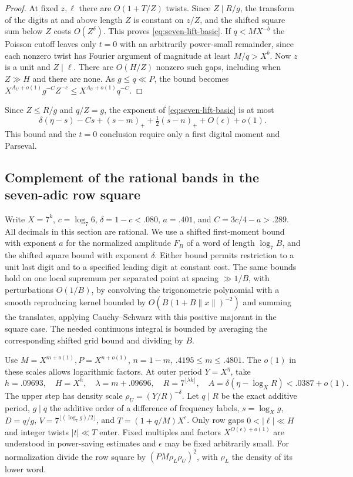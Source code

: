 \documentclass[11pt,a4paper]{article}
\theoremstyle{paperplain}
\numberwithin{equation}{section}
\begin{document}
\begin{proof}
At fixed $z,\ell$ there are $O(1+T/Z)$ twists.
Since $Z\mid R/g$, the transform of the digits at and above length
$Z$ is constant on $z/Z$, and the shifted square sum below $Z$ costs
$O(Z^\delta)$. This proves \eqref{eq:seven-lift-basic}. If
$q<MX^{-b}$ the Poisson cutoff leaves only $t=0$ with an arbitrarily
power-small remainder, since each nonzero twist has Fourier argument
of magnitude at least $M/q>X^b$. Now $z$ is a unit and $Z\mid\ell$.
There are $O(H/Z)$ nonzero such gaps, including when $Z\gg H$
and there are none. As $g\le q\ll P$, the bound becomes
$X^{A_U+o(1)}g^{-C}Z^{-c}\le X^{A_U+o(1)}q^{-C}$.
\end{proof}

Since $Z\le R/g$ and $q/Z=g$, the exponent of
\eqref{eq:seven-lift-basic} is at most
\[
   \delta(\eta-s)-Cs+(s-m)_++\tfrac12(s-n)_+
                 +O(\epsilon)+o(1).
\]
This bound and the $t=0$ conclusion require only a first digital
moment and Parseval.


\subsection{Complement of the rational bands in the seven-adic row square}
\label{sev:high}

Write $X=7^k$, $c=\log_7 6$, $\delta=1-c<.080$,
$a=.401$, and $C=3c/4-a>.289$. All decimals in this
section are rational. We use a shifted first-moment bound with
exponent $a$ for the normalized amplitude $F_B$ of a word
of length $\log_7 B$, and the shifted square bound with exponent
$\delta$. Either bound permits restriction to a unit last digit
and to a specified leading digit at constant cost. The same bounds
hold on one local supremum per separated point at spacing
$\gg1/B$, with perturbations $O(1/B)$, by convolving the trigonometric
polynomial with a smooth reproducing kernel bounded by
$O(B(1+B\|x\|)^{-2})$ and summing the translates, applying
Cauchy--Schwarz with this positive majorant in the square case.
The needed continuous integral is bounded by averaging the
corresponding shifted grid bound and dividing by $B$.

Use $M=X^{m+o(1)},P=X^{n+o(1)}$, $n=1-m$,
$.4195\le m\le .4801$. The $o(1)$ in these scales allows
logarithmic factors. At outer period $Y=X^\eta$, take
\[
 h=.09693,\quad H=X^h,\quad \lambda=m+.09696,\quad
 R=7^{\lfloor\lambda k\rfloor},\quad
 A=\delta(\eta-\log_X R)<.0387+o(1).
\]
The upper step has density scale $\rho_U=(Y/R)^{-\delta}$.
Let $q\mid R$ be the exact additive period, $g\mid q$ the additive
order of a difference of frequency labels, $s=\log_X g$,
$D=q/g$, $V=7^{\lfloor (\log_7 g)/2\rfloor}$, and
$T=(1+q/M)X^\epsilon$. Only row gaps $0<|\ell|\ll H$ and integer
twists $|t|\ll T$ enter. Fixed multiples and factors $X^{O(\epsilon)+o(1)}$
are understood in power-saving estimates and $\epsilon$ may be fixed
arbitrarily small. For normalization divide the row square by
$(PM\rho_L\rho_U)^2$, with $\rho_L$ the density of its lower word.
\end{document}

